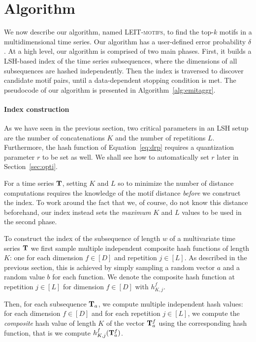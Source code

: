 \section{Algorithm}
\label{sec:algo}

We now describe our algorithm, named \textsc{LEIT-motifs}, to find the top-$k$ motifs in a multidimensional time series. Our algorithm has a user-defined error probability $\delta$.
At a high level, our algorithm is comprised of two main phases.
First, it builds a LSH-based index of the time series subsequences, where the dimensions of all subsequences are hashed independently.
Then the index is traversed to discover candidate motif pairs, until a data-dependent stopping condition is met.
The pseudocode of our algorithm is presented in Algorithm~\ref{alg:emitaggr}.

\paragraph{Index construction}
As we have seen in the previous section, two critical parameters in an LSH setup are the number of concatenations $K$ and the number of repetitions $L$.
Furthermore, the hash function of Equation~\eqref{eq:drp} requires a quantization parameter $r$ to be set as well. We shall see how to automatically set $r$ later in Section~\ref{sec:opti}.

For a time series $\mathbf{T}$, setting $K$ and $L$ so to minimize the number of distance computations requires the knowledge of the motif distance \emph{before} we construct the index.
To work around the fact that we, of course, do not know this distance beforehand, our index instead sets the \emph{maximum} $K$ and $L$ values to be used in the second phase.

To construct the index of the subsequence of length $w$ of a multivariate time series $\mathbf{T}$
we first sample multiple independent composite hash functions of length $K$: one for each dimension $f\in[D]$ and repetition $j\in[L]$. As described in the previous section, this is achieved by simply sampling a random vector $a$ and a random value $b$ for each function.
We denote the composite hash function at repetition $j\in[L]$ for dimension $f\in[D]$ with
$h_{K,j}^f$.

Then, for each subsequence $\mathbf{T}_{a}$, we compute multiple independent hash values:
for each dimension $f\in[D]$ and for each repetition $j\in[L]$, we compute
the \emph{composite} hash value of length $K$ of the vector $\mathbf{T}_{a}^{f}$ using the corresponding hash function, that is we compute $h_{K,j}^f(\mathbf{T}_{a}^{f})$.

